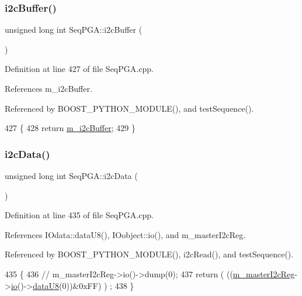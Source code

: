 \subsubsection{\texorpdfstring{i2c\+Buffer()}{i2cBuffer()}}
{\footnotesize\ttfamily unsigned long int Seq\+P\+G\+A\+::i2c\+Buffer (\begin{DoxyParamCaption}{ }\end{DoxyParamCaption})}



Definition at line 427 of file Seq\+P\+G\+A.\+cpp.



References m\+\_\+i2c\+Buffer.



Referenced by B\+O\+O\+S\+T\+\_\+\+P\+Y\+T\+H\+O\+N\+\_\+\+M\+O\+D\+U\+L\+E(), and test\+Sequence().


\begin{DoxyCode}
427                                    \{
428   \textcolor{keywordflow}{return} \hyperlink{classSeqPGA_afcef519379e9c6ba624ba58a4eac79f1}{m\_i2cBuffer};
429 \}
\end{DoxyCode}
\mbox{\label{classSeqPGA_a5e48f7b7ca1ada5a1decc0436dda4b26}} 
\subsubsection{\texorpdfstring{i2c\+Data()}{i2cData()}}
{\footnotesize\ttfamily unsigned long int Seq\+P\+G\+A\+::i2c\+Data (\begin{DoxyParamCaption}{ }\end{DoxyParamCaption})}



Definition at line 435 of file Seq\+P\+G\+A.\+cpp.



References I\+Odata\+::data\+U8(), I\+Oobject\+::io(), and m\+\_\+master\+I2c\+Reg.



Referenced by B\+O\+O\+S\+T\+\_\+\+P\+Y\+T\+H\+O\+N\+\_\+\+M\+O\+D\+U\+L\+E(), i2c\+Read(), and test\+Sequence().


\begin{DoxyCode}
435                                  \{
436   \textcolor{comment}{//  m\_masterI2cReg->io()->dump(0);}
437   \textcolor{keywordflow}{return} ( ((\hyperlink{classSeqPGA_a942c71b33a4f43b7a994cb9216abb17e}{m\_masterI2cReg}->\hyperlink{classIOobject_af04fb94137c3d86849f478ac5afab5d1}{io}()->\hyperlink{classIOdata_a75e9c318dbac3a39402179070943d4bc}{dataU8}(0))&0xFF) ) ;
438 \}
\end{DoxyCode}
\mbox{\label{classSeqPGA_a1d9edf6e3303581efe0bdb1b8b3fff0c}} 

